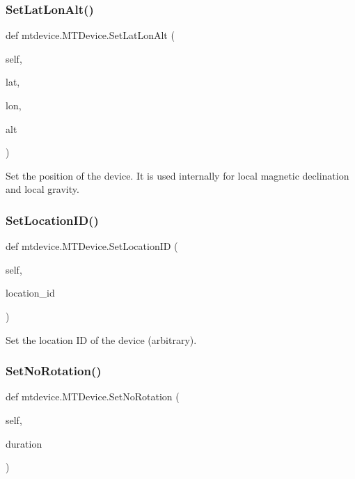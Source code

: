 \subsubsection{\texorpdfstring{Set\+Lat\+Lon\+Alt()}{SetLatLonAlt()}}
{\footnotesize\ttfamily def mtdevice.\+M\+T\+Device.\+Set\+Lat\+Lon\+Alt (\begin{DoxyParamCaption}\item[{}]{self,  }\item[{}]{lat,  }\item[{}]{lon,  }\item[{}]{alt }\end{DoxyParamCaption})}

\begin{DoxyVerb}Set the position of the device.
It is used internally for local magnetic declination and local gravity.
\end{DoxyVerb}
 \mbox{\label{classmtdevice_1_1MTDevice_a82701d9577a6bf7323b9a5649bebe4e0}} 
\subsubsection{\texorpdfstring{Set\+Location\+I\+D()}{SetLocationID()}}
{\footnotesize\ttfamily def mtdevice.\+M\+T\+Device.\+Set\+Location\+ID (\begin{DoxyParamCaption}\item[{}]{self,  }\item[{}]{location\+\_\+id }\end{DoxyParamCaption})}

\begin{DoxyVerb}Set the location ID of the device (arbitrary).\end{DoxyVerb}
 \mbox{\label{classmtdevice_1_1MTDevice_aec52bfabf3122d033b56d7e596d3c036}} 
\subsubsection{\texorpdfstring{Set\+No\+Rotation()}{SetNoRotation()}}
{\footnotesize\ttfamily def mtdevice.\+M\+T\+Device.\+Set\+No\+Rotation (\begin{DoxyParamCaption}\item[{}]{self,  }\item[{}]{duration }\end{DoxyParamCaption})}

